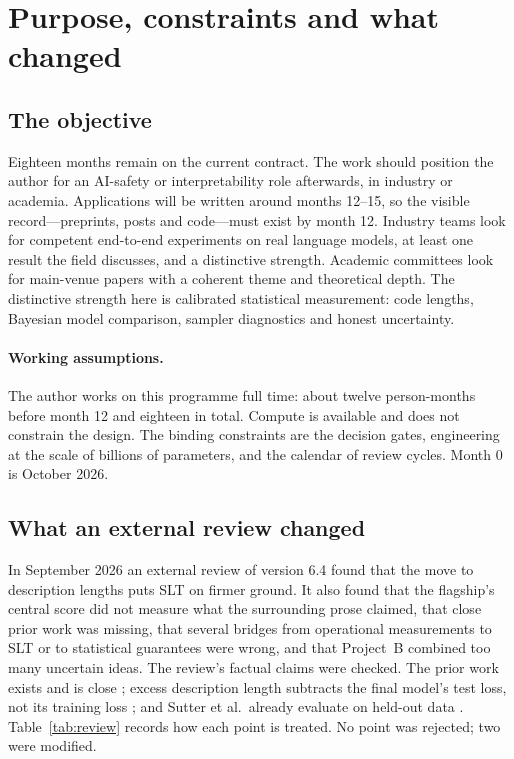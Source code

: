 \documentclass[11pt,a4paper]{article}
\begin{document}
\newpage
{\normalsize\tableofcontents}
\newpage

\section{Purpose, constraints and what changed}
\label{sec:purpose}

\subsection{The objective}

Eighteen months remain on the current contract. The work should position
the author for an AI-safety or interpretability role afterwards, in
industry or academia. Applications will be written around months 12--15,
so the visible record---preprints, posts and code---must exist by month
12. Industry teams look for competent end-to-end experiments on real
language models, at least one result the field discusses, and a
distinctive strength. Academic committees look for main-venue papers with
a coherent theme and theoretical depth. The distinctive strength here is
calibrated statistical measurement: code lengths, Bayesian model
comparison, sampler diagnostics and honest uncertainty.

\paragraph{Working assumptions.} The author works on this programme full
time: about twelve person-months before month 12 and eighteen in total.
Compute is available and does not constrain the design. The binding
constraints are the decision gates, engineering at the scale of billions
of parameters, and the calendar of review cycles. Month 0 is October 2026.

\subsection{What an external review changed}

In September 2026 an external review of version 6.4 found that the move to
description lengths puts SLT on firmer ground. It also found that the
flagship's central score did not measure what the surrounding prose
claimed, that close prior work was missing, that several bridges from
operational measurements to SLT or to statistical guarantees were wrong,
and that Project~B combined too many uncertain ideas. The review's factual
claims were checked. The prior work exists and is close \cite{ma2026};
excess description length subtracts the final model's test loss, not its
training loss \cite{donoway2026}; and Sutter et al.\ already evaluate on
held-out data \cite{sutter2025}. Table~\ref{tab:review} records how each
point is treated. No point was rejected; two were modified.
\end{document}
